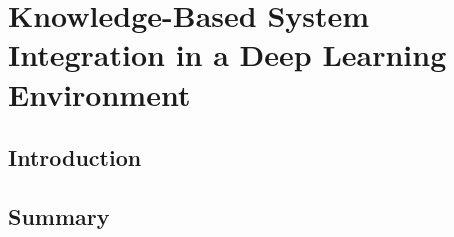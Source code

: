 \chapter{Knowledge-Based System Integration in a Deep Learning Environment}
\label{chap:kbsintegrationdl}

\section{Introduction}


\section{Summary}